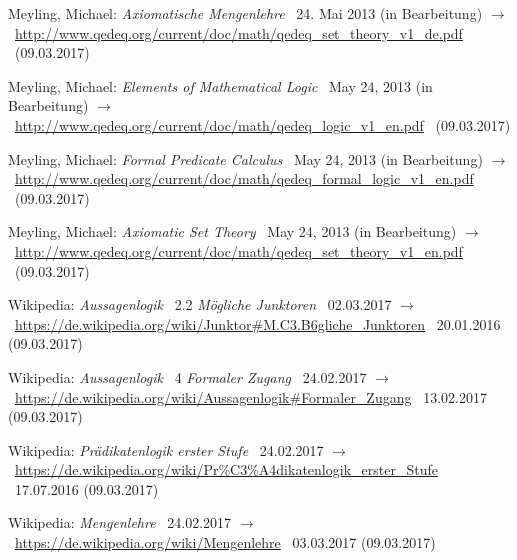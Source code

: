 \documentclass[english,ngerman,parskip=half,headsepline,footsepline]{scrreprt}
\begin{document}
\begin{flushleft}
\begin{thebibliography}{12}
			Meyling, Michael: \emph{Axiomatische Mengenlehre} \textendash\ 24. Mai 2013 (in Bearbeitung) $\rightarrow$~\url{http://www.qedeq.org/current/doc/math/qedeq_set_theory_v1_de.pdf} \textendash\ (09.03.2017)

			Meyling, Michael: \emph{Elements of Mathematical Logic} \textendash\ May 24, 2013 (in Bearbeitung) $\rightarrow$~\url{http://www.qedeq.org/current/doc/math/qedeq_logic_v1_en.pdf} \textendash\ (09.03.2017)

			Meyling, Michael: \emph{Formal Predicate Calculus} \textendash\ May 24, 2013 (in Bearbeitung) $\rightarrow$~\url{http://www.qedeq.org/current/doc/math/qedeq_formal_logic_v1_en.pdf} \textendash\ (09.03.2017)

			Meyling, Michael: \emph{Axiomatic Set Theory} \textendash\ May 24, 2013 (in Bearbeitung) $\rightarrow$~\url{http://www.qedeq.org/current/doc/math/qedeq_set_theory_v1_en.pdf} \textendash\ (09.03.2017)

			Wikipedia: \emph{Aussagenlogik} \chaptername~2.2 \emph{Mögliche Junktoren} \textendash\ 02.03.2017 $\rightarrow$~\url{https://de.wikipedia.org/wiki/Junktor#M.C3.B6gliche_Junktoren} \textendash\ 20.01.2016 (09.03.2017)

			Wikipedia: \emph{Aussagenlogik} \chaptername~4 \emph{Formaler Zugang} \textendash\ 24.02.2017 $\rightarrow$~\url{https://de.wikipedia.org/wiki/Aussagenlogik#Formaler_Zugang} \textendash\ 13.02.2017 (09.03.2017)

			Wikipedia: \emph{Prädikatenlogik erster Stufe} \textendash\ 24.02.2017  $\rightarrow$~\url{https://de.wikipedia.org/wiki/Pr%C3%A4dikatenlogik_erster_Stufe} \textendash\ 17.07.2016 (09.03.2017)

			Wikipedia: \emph{Mengenlehre} \textendash\ 24.02.2017 $\rightarrow$~\url{https://de.wikipedia.org/wiki/Mengenlehre} \textendash\ 03.03.2017 (09.03.2017)

		\end{thebibliography}
	\end{flushleft}
	\thispagestyle{scrheadings}
\end{document}
